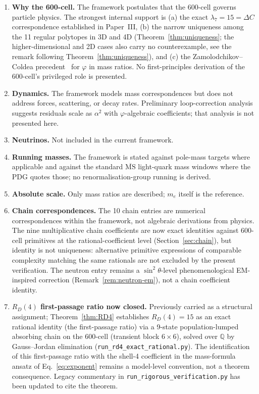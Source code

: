 \documentclass[12pt]{article}
\newcommand{\phig}{\varphi}
\begin{document}
\begin{enumerate}
    \item \textbf{Why the 600-cell.} The framework postulates that the 600-cell governs particle physics. The strongest internal support is (a) the exact $\lambda_7 = 15 = \Delta C$ correspondence established in Paper~III, (b) the narrow uniqueness among the 11 regular polytopes in 3D and 4D (Theorem~\ref{thm:uniqueness}; the higher-dimensional and 2D cases also carry no counterexample, see the remark following Theorem~\ref{thm:uniqueness}), and (c) the Zamolodchikov--Coldea precedent~\citep{Zamolodchikov1989, Coldea2010} for $\phig$ in mass ratios. No first-principles derivation of the 600-cell's privileged role is presented.
    \item \textbf{Dynamics.} The framework models mass correspondences but does not address forces, scattering, or decay rates. Preliminary loop-correction analysis suggests residuals scale as $\alpha^2$ with $\phig$-algebraic coefficients; that analysis is not presented here.
    \item \textbf{Neutrinos.} Not included in the current framework.
    \item \textbf{Running masses.} The framework is stated against pole-mass targets where applicable and against the standard $\overline{\mathrm{MS}}$ light-quark mass windows where the PDG quotes those; no renormalisation-group running is derived.
    \item \textbf{Absolute scale.} Only mass ratios are described; $m_e$ itself is the reference.
    \item \textbf{Chain correspondences.} The 10 chain entries are numerical correspondences within the framework, not algebraic derivations from physics. The nine multiplicative chain coefficients are now exact identities against 600-cell primitives at the rational-coefficient level (Section~\ref{sec:chain}), but identity is not uniqueness: alternative primitive expressions of comparable complexity matching the same rationals are not excluded by the present verification. The neutron entry remains a $\sin^2\theta$-level phenomenological EM-inspired correction (Remark~\ref{rem:neutron-em}), not a chain coefficient identity.
    \item \textbf{$R_D(4)$ first-passage ratio now closed.} Previously carried as a structural assignment; Theorem~\ref{thm:RD4} establishes $R_D(4) = 15$ as an exact rational identity (the first-passage ratio) via a 9-state population-lumped absorbing chain on the 600-cell (transient block $6 \times 6$), solved over $\mathbb{Q}$ by Gauss--Jordan elimination (\texttt{run\_rd4\_exact\_rational.py}). The identification of this first-passage ratio with the shell-4 coefficient in the mass-formula ansatz of Eq.~\eqref{eq:exponent} remains a model-level convention, not a theorem consequence. Legacy commentary in \texttt{run\_rigorous\_verification.py} has been updated to cite the theorem.

\end{enumerate}
\end{document}
